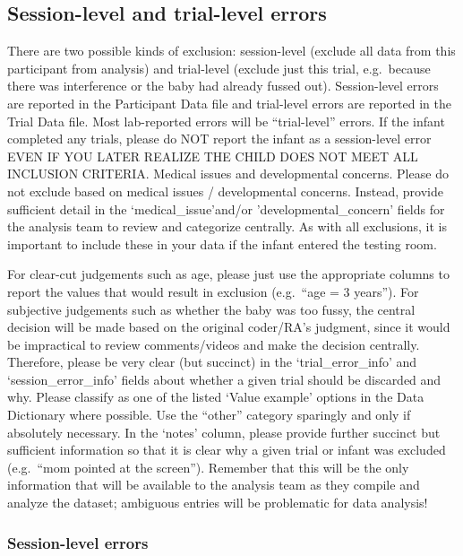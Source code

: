 \documentclass[
  letterpaper,
  DIV=11,
  numbers=noendperiod,
  oneside]{scrreprt}
\begin{document}
\subsection{Session-level and trial-level
errors}\label{session-level-and-trial-level-errors}

There are two possible kinds of exclusion: session-level (exclude all
data from this participant from analysis) and trial-level (exclude just
this trial, e.g.~because there was interference or the baby had already
fussed out). Session-level errors are reported in the Participant Data
file and trial-level errors are reported in the Trial Data file. Most
lab-reported errors will be ``trial-level'' errors. If the infant
completed any trials, please do NOT report the infant as a session-level
error EVEN IF YOU LATER REALIZE THE CHILD DOES NOT MEET ALL INCLUSION
CRITERIA. Medical issues and developmental concerns. Please do not
exclude based on medical issues / developmental concerns. Instead,
provide sufficient detail in the `medical\_issue'and/or
'developmental\_concern' fields for the analysis team to review and
categorize centrally. As with all exclusions, it is important to include
these in your data if the infant entered the testing room.

For clear-cut judgements such as age, please just use the appropriate
columns to report the values that would result in exclusion (e.g.~``age
= 3 years''). For subjective judgements such as whether the baby was too
fussy, the central decision will be made based on the original
coder/RA's judgment, since it would be impractical to review
comments/videos and make the decision centrally. Therefore, please be
very clear (but succinct) in the `trial\_error\_info' and
`session\_error\_info' fields about whether a given trial should be
discarded and why. Please classify as one of the listed `Value example'
options in the Data Dictionary where possible. Use the ``other''
category sparingly and only if absolutely necessary. In the `notes'
column, please provide further succinct but sufficient information so
that it is clear why a given trial or infant was excluded (e.g.~``mom
pointed at the screen''). Remember that this will be the only
information that will be available to the analysis team as they compile
and analyze the dataset; ambiguous entries will be problematic for data
analysis!

\subsubsection{Session-level errors}\label{session-level-errors}
\end{document}
